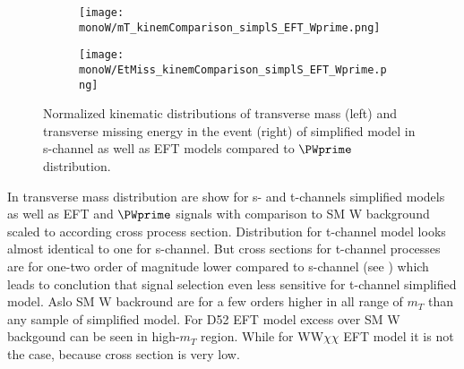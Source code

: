 
\begin{figure}[]

\begin{subfigure}{.5\textwidth}
  \centering
  \texttt{[image: monoW/mT\_kinemComparison\_simplS\_EFT\_Wprime.png]}
\end{subfigure}%
\begin{subfigure}{.5\textwidth}
  \centering
  \texttt{[image: monoW/EtMiss\_kinemComparison\_simplS\_EFT\_Wprime.png]}
\end{subfigure}

\caption{Normalized kinematic distributions of transverse mass (left) and transverse missing energy in the event (right) of simplified model in s-channel as well as EFT models compared to $\PWprime$ distribution.}
  \label{fig:kinematicsSChannel}
\end{figure}

In  transverse mass distribution are show for s- and t-channels simplified models as well as EFT and $\PWprime$ signals with comparison to SM W background 
scaled to according cross process section. Distribution for t-channel model looks almost identical to one for s-channel. 
But cross sections for t-channel processes are for one-two order of magnitude lower compared to s-channel (see ) which leads to conclution
that signal selection even less sensitive for t-channel simplified model. Aslo SM W backround are for a few orders higher in all range of $m_{T}$ than any sample of simplified model.
For D52 EFT model excess over SM W backgound can be seen in high-$m_{T}$ region. While for WW$\chi\chi$ EFT model it is not the case, because cross section is very low.


